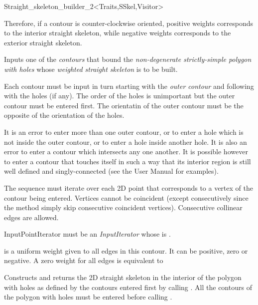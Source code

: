 \begin{ccRefClass}{Straight_skeleton_builder_2<Traits,SSkel,Visitor>}
{Therefore, if a contour is counter-clockwise oriented, positive weights corresponds to the interior straight skeleton, while negative weights corresponds to the exterior straight skeleton.



}
\ccGlue
{}
{Inputs one of the \textit{contours} that bound the \textit{non-degenerate strictly-simple polygon with holes} whose \textit{weighted straight skeleton} is to be built. 

Each contour must be input in turn starting with the \textit{outer contour} and following with the holes (if any). The order of the holes is unimportant but the outer contour must be entered first.
The orientatin of the outer contour must be the opposite of the orientation of the holes.

It is an error to enter more than one outer contour, or to enter a hole which is not inside the outer contour, or to enter a hole inside another hole. It is also an error to enter a contour
which intersects any one another. It is possible however to enter a contour that touches itself in such a way that its interior region is still well defined and singly-connected (see the User Manual for examples).

The sequence \ccc{[aBegin,aEnd)} must iterate over each 2D point that corresponds to a vertex of the contour being entered. Vertices cannot be coincident (except consecutively since the method simply skip consecutive coincident vertices). Consecutive collinear edges are allowed.

InputPointIterator must be an \textit{InputIterator} whose  is .

 is a uniform weight given to all edges in this contour. It can be positive, zero or negative. A zero weight for all edges is equivalent to 


}
\ccGlue
{}
{Constructs and returns the 2D straight skeleton in the interior of the polygon with holes as defined by the contours entered first by calling . All the contours of the polygon with holes must be entered before calling .

}
\end{ccRefClass}
